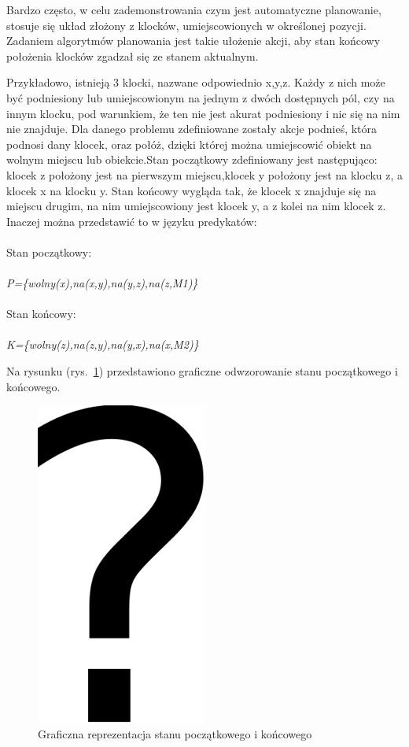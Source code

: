 Bardzo często, w celu zademonstrowania czym jest automatyczne planowanie, stosuje się układ złożony z klocków, umiejscowionych w określonej pozycji. Zadaniem algorytmów planowania jest takie ułożenie akcji, aby stan końcowy położenia klocków zgadzał się ze stanem aktualnym. 

Przykładowo, istnieją 3 klocki, nazwane odpowiednio x,y,z. Każdy z nich może być podniesiony lub umiejscowionym na jednym z dwóch dostępnych pól, czy na innym klocku, pod warunkiem, że ten nie jest akurat podniesiony i nic się na nim nie znajduje. Dla danego problemu zdefiniowane zostały akcje podnieś, która podnosi dany klocek, oraz połóż, dzięki której można umiejscowić obiekt na wolnym miejscu lub obiekcie.Stan początkowy zdefiniowany jest następująco: klocek z położony jest na pierwszym miejscu,klocek y położony jest na klocku z, a klocek x na klocku y. Stan końcowy wygląda tak, że klocek x znajduje się na miejscu drugim, na nim umiejscowiony jest klocek y, a z kolei na nim klocek z. Inaczej można przedstawić to w języku predykatów:
\\\\
Stan początkowy:
\\\\
\textit{P=\{wolny(x),na(x,y),na(y,z),na(z,M1)\}}
\\\\
Stan końcowy:
\\\\
\textit{K=\{wolny(z),na(z,y),na(y,x),na(x,M2)\}}

Na rysunku (rys.~\ref{fig:automatyczne-planowanie}) przedstawiono graficzne odwzorowanie stanu początkowego i końcowego.
\begin{figure}[h!]
    \centering
    \includegraphics[width=0.5\textwidth]{img/rys2,1}
    \caption{Graficzna reprezentacja stanu początkowego i końcowego}
    \label{fig:automatyczne-planowanie}
\end{figure}


